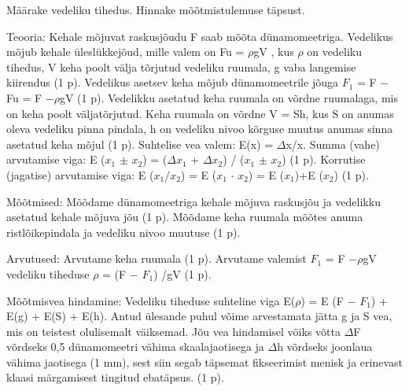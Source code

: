 
Määrake vedeliku tihedus. Hinnake mõõtmistulemuse täpsust.

\hint

\solu
Teooria: Kehale mõjuvat raskusjõudu F saab mõõta dünamomeetriga. Vedelikus mõjub kehale üleslükkejõud, mille valem on Fu = $\rho$gV , kus $\rho$ on vedeliku tihedus, V keha poolt välja tõrjutud vedeliku ruumala, g vaba langemise kiirendus (1 p). Vedelikus asetsev keha mõjub dünamomeetrile jõuga $F_1$ = F $-$ Fu = F $- \rho$gV (1 p). Vedelikku asetatud keha ruumala on võrdne ruumalaga, mis on keha poolt väljatõrjutud. Keha ruumala on võrdne V = Sh, kus S on anumas oleva vedeliku pinna pindala, h on vedeliku nivoo kõrguse muutus anumas sinna asetatud keha mõjul (1 p). Suhtelise vea valem: E(x) = $\Delta$x/x. Summa (vahe) arvutamise viga: E ($x_1$ $\pm$ $x_2$) = ($\Delta$$x_1$ + $\Delta$$x_2$) / ($x_1$ $\pm$ $x_2$) (1 p). Korrutise (jagatise) arvutamise viga: E ($x_1$/$x_2$) = E ($x_1$ $\cdot$ $x_2$) = E ($x_1$)+E ($x_2$) (1 p).

Mõõtmised: Mõõdame dünamomeetriga kehale mõjuva raskusjõu ja vedelikku asetatud kehale mõjuva jõu (1 p). Mõõdame keha ruumala mõõtes anuma ristlõikepindala ja vedeliku nivoo muutuse (1 p).

Arvutused: Arvutame keha ruumala (1 p). Arvutame valemist $F_1$ = F $- \rho$gV vedeliku tiheduse $\rho$ = (F $-$ $F_1$) /gV (1 p).

Mõõtmisvea hindamine: Vedeliku tiheduse suhteline viga E($\rho$) = E (F $-$ $F_1$) + E(g) + E(S) + E(h). Antud ülesande puhul võime arvestamata jätta g ja S vea, mis on teistest olulisemalt väiksemad. Jõu vea hindamisel võiks võtta $\Delta$F võrdseks 0,5 dünamomeetri vähima skaalajaotisega ja $\Delta$h võrdseks joonlaua vähima jaotisega (1 mm), sest siin segab täpsemat fikseerimist menisk ja erinevast klaasi märgamisest tingitud ebatäpsus. (1 p).
\probend
